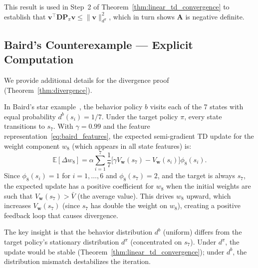 \documentclass[11pt,a4paper]{article}
\theoremstyle{definition}
\theoremstyle{plain}
\theoremstyle{remark}
\newcommand{\E}{\mathbb{E}}
\begin{document}
This result is used in Step~2 of Theorem~\ref{thm:linear_td_convergence} to establish that $\bm{v}^\top\bm{D}\bm{P}_\pi\bm{v} \leq \|\bm{v}\|_{d^\pi}^2$, which in turn shows $\bm{A}$ is negative definite.

\subsection{Baird's Counterexample --- Explicit Computation}
\label{app:baird}

We provide additional details for the divergence proof (Theorem~\ref{thm:divergence}).

In Baird's star example~\cite{baird1995}, the behavior policy $b$ visits each of the 7 states with equal probability $d^b(s_i) = 1/7$. Under the target policy $\pi$, every state transitions to $s_7$. With $\gamma = 0.99$ and the feature representation~\eqref{eq:baird_features}, the expected semi-gradient TD update for the weight component $w_8$ (which appears in all state features) is:
\begin{equation}
    \E[\Delta w_8] = \alpha \sum_{i=1}^{7} \frac{1}{7}\bigl[\gamma V_{\bm{w}}(s_7) - V_{\bm{w}}(s_i)\bigr]\phi_8(s_i).
\end{equation}
Since $\phi_8(s_i) = 1$ for $i=1,\ldots,6$ and $\phi_8(s_7) = 2$, and the target is always $s_7$, the expected update has a positive coefficient for $w_8$ when the initial weights are such that $V_{\bm{w}}(s_7) > \bar{V}$ (the average value). This drives $w_8$ upward, which increases $V_{\bm{w}}(s_7)$ (since $s_7$ has double the weight on $w_8$), creating a positive feedback loop that causes divergence.

The key insight is that the behavior distribution $d^b$ (uniform) differs from the target policy's stationary distribution $d^\pi$ (concentrated on $s_7$). Under $d^\pi$, the update would be stable (Theorem~\ref{thm:linear_td_convergence}); under $d^b$, the distribution mismatch destabilizes the iteration.
\end{document}
